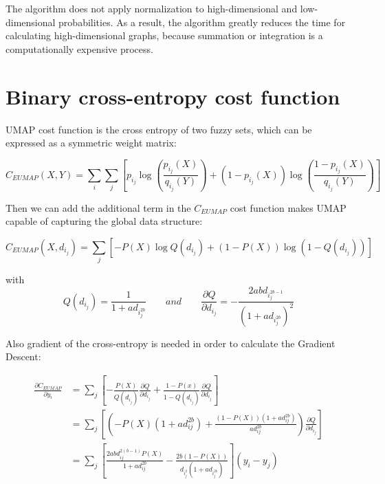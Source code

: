 \noindent The algorithm does not apply normalization to high-dimensional and low-dimensional probabilities. As a result, the algorithm greatly reduces the time for calculating high-dimensional graphs, because summation or integration is a computationally expensive process.\\

\section{Binary cross-entropy cost function}

UMAP cost function is the cross entropy of two fuzzy sets, which can be expressed as a symmetric weight matrix:

\begin{equation*}
    C_{EUMAP}(X,Y) = \sum_{i} \sum _{j}[p_i_j \log(\frac{p_i_j(X)}{q_i_j(Y)}) + (1-p_i_j(X))\log (\frac{1-p_i_j(X)}{q_i_j(Y)})]
\end{equation*}

\noindent Then we can add the additional term in the $C_{EUMAP}$ cost function makes UMAP capable of capturing the global data structure:

\begin{equation*}
    C_{EUMAP}(X,d_i_j) = \sum _{j}[-P(X) \log Q(d_i_j) + (1 - P(X)) \log (1-Q(d_i_j))]
\end{equation*}

with \begin{equation*}
    Q(d_i_j) = \frac{1}{1+ad_i_j^{2b}}  \qquad and \qquad   \frac{\partial Q}{\partial d_i_j} = -\frac{2abd_i_j^{2b-1}}{(1+ad_i_j^{2b})^2}
\end{equation*}

\noindent Also gradient of the cross-entropy is needed in order to calculate the Gradient Descent:

\begin{equation*}
\begin{aligned}
\frac{\partial C_{EUMAP}}{\partial y_i}  &= \sum_j\left[- \frac{P(X)}{Q(d_i_j)} \frac{\partial Q}{\partial d_i_j} + \frac{1-P(x)}{1-Q(d_i_j)} \frac{\partial Q}{\partial d_i_j}\right]\\
&= \sum_j \left[ \left( -P(X)(1+ad_{ij}^{2b}) + \frac{(1-P(X))(1 + ad_{ij}^{2b})}{ad_{ij}^{2b}} \right) \frac{\partial Q}{\partial d_i_j}\right]\\
&= \sum_j \left[ \frac{2abd_{ij}^{2(b-1)}P(X)}{1 + ad_{ij}^{2b}} - \frac{2b(1-P(X))}{d_i_j^2(1+ad_i_j^{2b})} \right](y_i - y_j)
\end{aligned}
\end{equation*}\\

